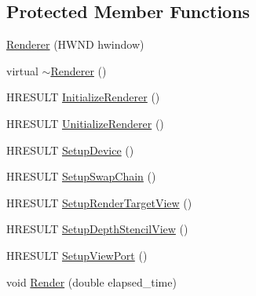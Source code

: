 \subsection*{Protected Member Functions}
\begin{DoxyCompactItemize}
\item 
\hyperlink{classmage_1_1_renderer_a762dcda433c319af237d1dfd9bc6095f}{Renderer} (H\+W\+ND hwindow)
\item 
virtual \hyperlink{classmage_1_1_renderer_a997e041f28cc71d069d1ab7d29fe6ced}{$\sim$\+Renderer} ()
\item 
H\+R\+E\+S\+U\+LT \hyperlink{classmage_1_1_renderer_aafed50e7e14ca597541c091941351929}{Initialize\+Renderer} ()
\item 
H\+R\+E\+S\+U\+LT \hyperlink{classmage_1_1_renderer_a308beaf67b11128f02e87778b6a9c3c7}{Unitialize\+Renderer} ()
\item 
H\+R\+E\+S\+U\+LT \hyperlink{classmage_1_1_renderer_a4ee0187fb63587a219798523fb8cb7a6}{Setup\+Device} ()
\item 
H\+R\+E\+S\+U\+LT \hyperlink{classmage_1_1_renderer_af2aa545594936261bf2639e4e0814a83}{Setup\+Swap\+Chain} ()
\item 
H\+R\+E\+S\+U\+LT \hyperlink{classmage_1_1_renderer_afe99715a4ae6432ba561dcab048f79b4}{Setup\+Render\+Target\+View} ()
\item 
H\+R\+E\+S\+U\+LT \hyperlink{classmage_1_1_renderer_a95a34b64e815b0e5e95ce539bbd0f5a3}{Setup\+Depth\+Stencil\+View} ()
\item 
H\+R\+E\+S\+U\+LT \hyperlink{classmage_1_1_renderer_a9bc8598ccca5f6e7cf99010175b1360b}{Setup\+View\+Port} ()
\item 
void \hyperlink{classmage_1_1_renderer_a95ac55eb4cc79a5712a50bfb78f67fe6}{Render} (double elapsed\+\_\+time)
\end{DoxyCompactItemize}
